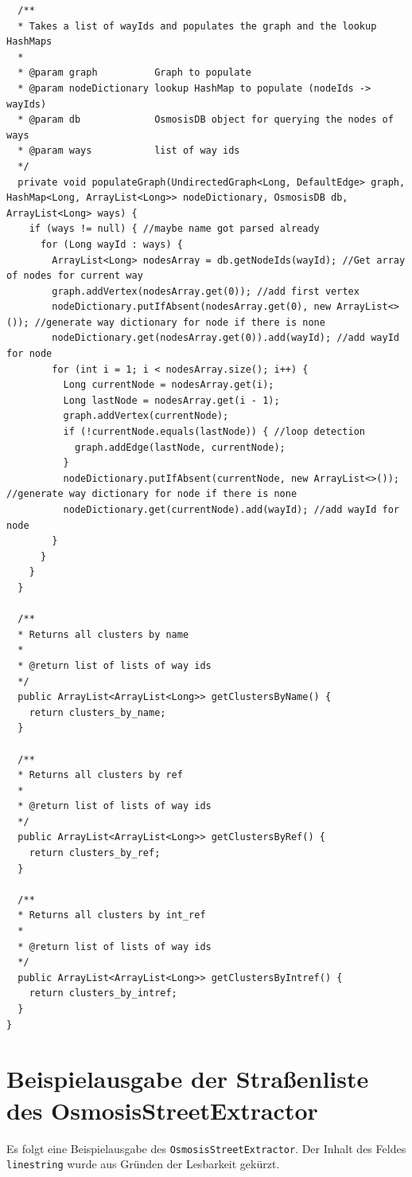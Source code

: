 \begin{lstlisting}
  /**
  * Takes a list of wayIds and populates the graph and the lookup HashMaps
  *
  * @param graph          Graph to populate
  * @param nodeDictionary lookup HashMap to populate (nodeIds -> wayIds)
  * @param db             OsmosisDB object for querying the nodes of ways
  * @param ways           list of way ids
  */
  private void populateGraph(UndirectedGraph<Long, DefaultEdge> graph, HashMap<Long, ArrayList<Long>> nodeDictionary, OsmosisDB db, ArrayList<Long> ways) {
    if (ways != null) { //maybe name got parsed already
      for (Long wayId : ways) {
        ArrayList<Long> nodesArray = db.getNodeIds(wayId); //Get array of nodes for current way
        graph.addVertex(nodesArray.get(0)); //add first vertex
        nodeDictionary.putIfAbsent(nodesArray.get(0), new ArrayList<>()); //generate way dictionary for node if there is none
        nodeDictionary.get(nodesArray.get(0)).add(wayId); //add wayId for node
        for (int i = 1; i < nodesArray.size(); i++) {
          Long currentNode = nodesArray.get(i);
          Long lastNode = nodesArray.get(i - 1);
          graph.addVertex(currentNode);
          if (!currentNode.equals(lastNode)) { //loop detection
            graph.addEdge(lastNode, currentNode);
          }
          nodeDictionary.putIfAbsent(currentNode, new ArrayList<>()); //generate way dictionary for node if there is none
          nodeDictionary.get(currentNode).add(wayId); //add wayId for node
        }
      }
    }
  }
  
  /**
  * Returns all clusters by name
  *
  * @return list of lists of way ids
  */
  public ArrayList<ArrayList<Long>> getClustersByName() {
    return clusters_by_name;
  }
  
  /**
  * Returns all clusters by ref
  *
  * @return list of lists of way ids
  */
  public ArrayList<ArrayList<Long>> getClustersByRef() {
    return clusters_by_ref;
  }
  
  /**
  * Returns all clusters by int_ref
  *
  * @return list of lists of way ids
  */
  public ArrayList<ArrayList<Long>> getClustersByIntref() {
    return clusters_by_intref;
  }
}
\end{lstlisting}

\section{Beispielausgabe der Straßenliste des OsmosisStreetExtractor}
\label{sec:appendix:ose:output}
Es folgt eine Beispielausgabe des \texttt{OsmosisStreetExtractor}.
Der Inhalt des Feldes \texttt{linestring} wurde aus Gründen der Lesbarkeit gekürzt.

